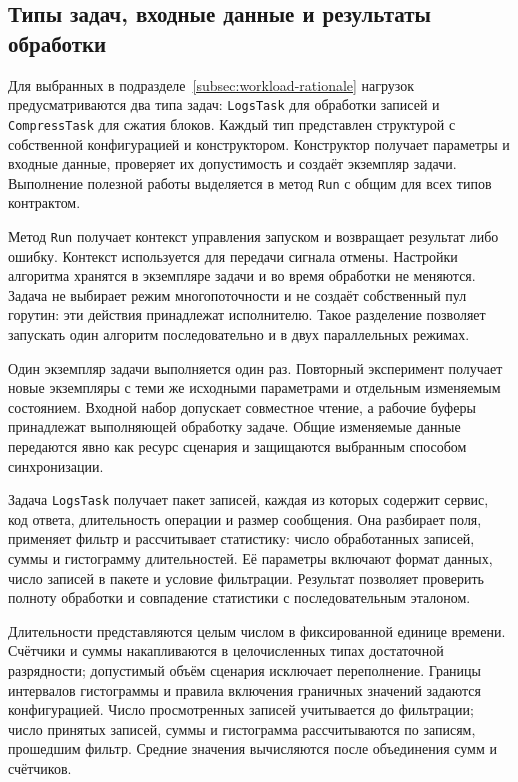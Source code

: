 
\subsection{Типы задач, входные данные и результаты обработки}
\label{subsec:task-requirements}

Для выбранных в подразделе~\ref{subsec:workload-rationale} нагрузок предусматриваются два типа
  задач: \texttt{LogsTask} для обработки записей и \texttt{CompressTask} для сжатия блоков.
  Каждый тип представлен структурой с собственной конфигурацией и конструктором. Конструктор
  получает параметры и входные данные, проверяет их допустимость и создаёт экземпляр задачи.
  Выполнение полезной работы выделяется в метод \texttt{Run} с общим для всех типов контрактом.

Метод \texttt{Run} получает контекст управления запуском и возвращает результат либо ошибку.
  Контекст используется для передачи сигнала отмены. Настройки алгоритма хранятся в экземпляре
  задачи и во время обработки не меняются. Задача не выбирает режим многопоточности и не создаёт
  собственный пул горутин: эти действия принадлежат исполнителю. Такое разделение позволяет
  запускать один алгоритм последовательно и в двух параллельных режимах.

Один экземпляр задачи выполняется один раз. Повторный эксперимент получает новые экземпляры
  с теми же исходными параметрами и отдельным изменяемым состоянием. Входной набор допускает
  совместное чтение, а рабочие буферы принадлежат выполняющей обработку задаче. Общие изменяемые
  данные передаются явно как ресурс сценария и защищаются выбранным способом синхронизации.

Задача \texttt{LogsTask} получает пакет записей, каждая из которых содержит сервис, код ответа,
  длительность операции и размер сообщения. Она разбирает поля, применяет фильтр и рассчитывает
  статистику: число обработанных записей, суммы и гистограмму длительностей. Её параметры включают
  формат данных, число записей в пакете и условие фильтрации. Результат позволяет проверить
  полноту обработки и совпадение статистики с последовательным эталоном.

Длительности представляются целым числом в фиксированной единице времени. Счётчики и суммы
  накапливаются в целочисленных типах достаточной разрядности; допустимый объём сценария исключает
  переполнение. Границы интервалов гистограммы и правила включения граничных значений задаются
  конфигурацией. Число просмотренных записей учитывается до фильтрации; число принятых записей,
  суммы и гистограмма рассчитываются по записям, прошедшим фильтр. Средние значения вычисляются
  после объединения сумм и счётчиков.

